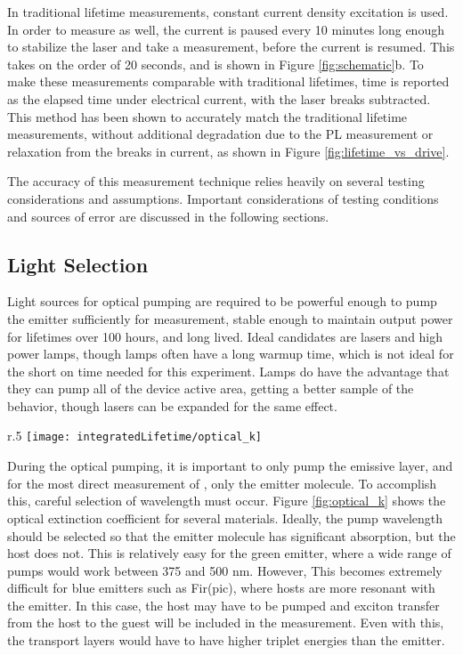 \documentclass[../thesis.tex]{subfiles}
\begin{document}
In traditional lifetime measurements, constant current density excitation is used.  
In order to measure \pl as well, the current is paused every 10 minutes long enough to stabilize the laser and take a measurement, before the current is resumed.
This takes on the order of 20 seconds, and is shown in Figure \ref{fig:schematic}b.
To make these measurements comparable with traditional lifetimes, time is reported as the elapsed time under electrical current, with the laser breaks subtracted.
This method has been shown to accurately match the traditional lifetime measurements, without additional degradation due to the PL measurement or relaxation from the breaks in current, as shown in Figure \ref{fig:lifetime_vs_drive}.

The accuracy of this measurement technique relies heavily on several testing considerations and assumptions.
Important considerations of testing conditions and sources of error are discussed in the following sections.

\subsection{Light Selection}

Light sources for optical pumping are required to be powerful enough to pump the emitter sufficiently for measurement, stable enough to maintain output power for lifetimes over 100 hours, and long lived.
Ideal candidates are lasers and high power lamps, though lamps often have a long warmup time, which is not ideal for the short on time needed for this experiment.
Lamps do have the advantage that they can pump all of the device active area, getting a better sample of the behavior, though lasers can be expanded for the same effect.

\begin{wrapfigure}{r}{.5\textwidth}
\centering
\texttt{[image: integratedLifetime/optical\_k]}
\caption{Extinction coefficients shown for the green emitter \irppy and blue emitter Fir(pic) as well as a few host materials.}
\label{fig:optical_k}
\end{wrapfigure}

During the optical pumping, it is important to only pump the emissive layer, and for the most direct measurement of \pl, only the emitter molecule.
To accomplish this, careful selection of wavelength must occur.  
Figure \ref{fig:optical_k} shows the optical extinction coefficient for several materials.  
Ideally, the pump wavelength should be selected so that the emitter molecule has significant absorption, but the host does not.  
This is relatively easy for the green emitter, \irppy where a wide range of pumps would work between 375 and 500 nm.
However, This becomes extremely difficult for blue emitters such as Fir(pic), where hosts are more resonant with the emitter.  
In this case, the host may have to be pumped and exciton transfer from the host to the guest will be included in the measurement.
Even with this, the transport layers would have to have higher triplet energies than the emitter.
\end{document}
